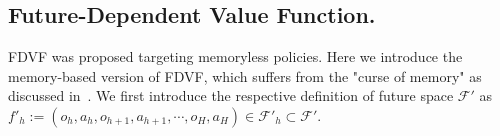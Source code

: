 \documentclass[twoside]{article}
\newtheorem{definition}{Definition}
\DeclareMathOperator*{\argmin}{arg\,min}
\newcommand{\R}{\mathbb{R}}
\newcommand{\CAL}[1]{\mathcal{#1}}
\begin{document}
\subsection{Future-Dependent Value Function.}\label{Chapter:FDVF}
FDVF was proposed targeting memoryless policies.  %
Here we introduce the memory-based version of FDVF, which suffers from the "curse of memory" as discussed in~\cite{zhang2024cursesfuturehistoryfuturedependent}.
We first introduce the respective definition of future space $\CAL{F}'$ as $f'_h:=(o_h,a_h,o_{h+1},a_{h+1},\cdots,o_H,a_H)\in\CAL{F}'_h\subset\CAL{F}'.$

\end{document}
